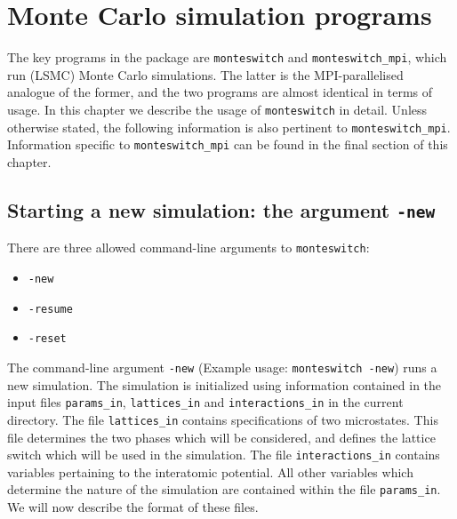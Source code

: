 \documentclass{report}
\begin{document}
\chapter{Monte Carlo simulation programs}\label{chapter:simulation_programs}
The key programs in the package are \texttt{monteswitch} and \texttt{monteswitch\_mpi}, which run (LSMC) Monte Carlo simulations. 
The latter is the MPI-parallelised analogue of the former, and the two programs are almost identical in terms of usage.
In this chapter we describe the usage of \texttt{monteswitch} in detail. Unless otherwise stated, the following information
is also pertinent to \texttt{monteswitch\_mpi}. Information specific to \texttt{monteswitch\_mpi} can be found in 
the final section of this chapter.

\section{Starting a new simulation: the argument \texttt{-new}}
There are three allowed command-line arguments to \texttt{monteswitch}: 
\begin{itemize}
\item\texttt{-new}
\item\texttt{-resume}
\item\texttt{-reset}
\end{itemize}
The command-line argument \texttt{-new} (Example usage: \texttt{monteswitch -new}) runs a new simulation. 
The simulation is initialized using information contained in the input files \texttt{params\_in}, \texttt{lattices\_in} and \texttt{interactions\_in} in
the current directory. The file \texttt{lattices\_in} contains specifications of two microstates. This file determines the two phases which will be 
considered, and defines the lattice switch which will be used in the simulation. The file \texttt{interactions\_in} contains variables pertaining to 
the interatomic potential. All other variables which determine the nature of the simulation are contained within the file \texttt{params\_in}.
We will now describe the format of these files.
\end{document}
